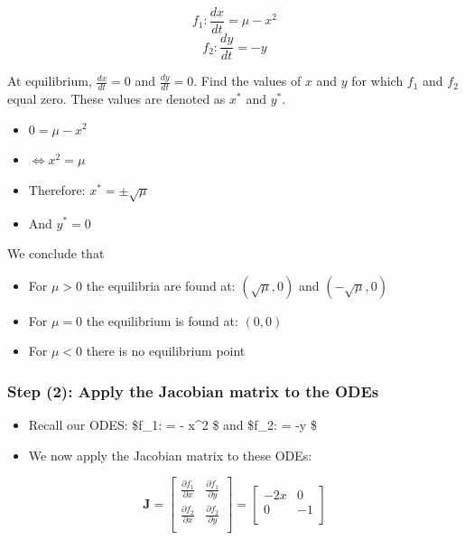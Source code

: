 \documentclass[
]{article}
\providecommand{\tightlist}{%
  \setlength{\itemsep}{0pt}\setlength{\parskip}{0pt}}
\begin{document}
\[f_1: \frac{dx}{dt} = \mu - x^2 \] \[f_2: \frac{dy}{dt} = -y \]

At equilibrium, \(\frac{dx}{dt} = 0\) and \(\frac{dy}{dt} = 0\). Find
the values of \(x\) and \(y\) for which \(f_1\) and \(f_2\) equal zero.
These values are denoted as \(x^*\) and \(y^*\).

\begin{itemize}
\tightlist
\item
  \(0 = \mu - x^2\)
\item
  \(\Leftrightarrow x^2 = \mu\)
\item
  Therefore: \(x^* = \pm \sqrt{\mu}\)
\item
  And \(y^* = 0\)
\end{itemize}

We conclude that

\begin{itemize}
\tightlist
\item
  For \(\mu>0\) the equilibria are found at: \((\sqrt{\mu}, 0)\) and
  \((-\sqrt{\mu}, 0)\)
\item
  For \(\mu=0\) the equilibrium is found at: \((0, 0)\)
\item
  For \(\mu<0\) there is no equilibrium point
\end{itemize}

\hypertarget{step-2-apply-the-jacobian-matrix-to-the-odes}{%
\subsubsection{Step (2): Apply the Jacobian matrix to the
ODEs}\label{step-2-apply-the-jacobian-matrix-to-the-odes}}

\begin{itemize}
\item
  Recall our ODES: \$f\_1:  = \mu - x\^{}2 \$ and \$f\_2:
   = -y \$
\item
  We now apply the Jacobian matrix to these ODEs:
\end{itemize}

\[
\mathbf{J} =
\begin{bmatrix}
\frac{\partial f_1}{\partial x} & \frac{\partial f_1}{\partial y} \\
\frac{\partial f_2}{\partial x} & \frac{\partial f_2}{\partial y} \\
\end{bmatrix}
=
\begin{bmatrix}
-2x & 0 \\
0 & -1 \\
\end{bmatrix}
\]
\end{document}
